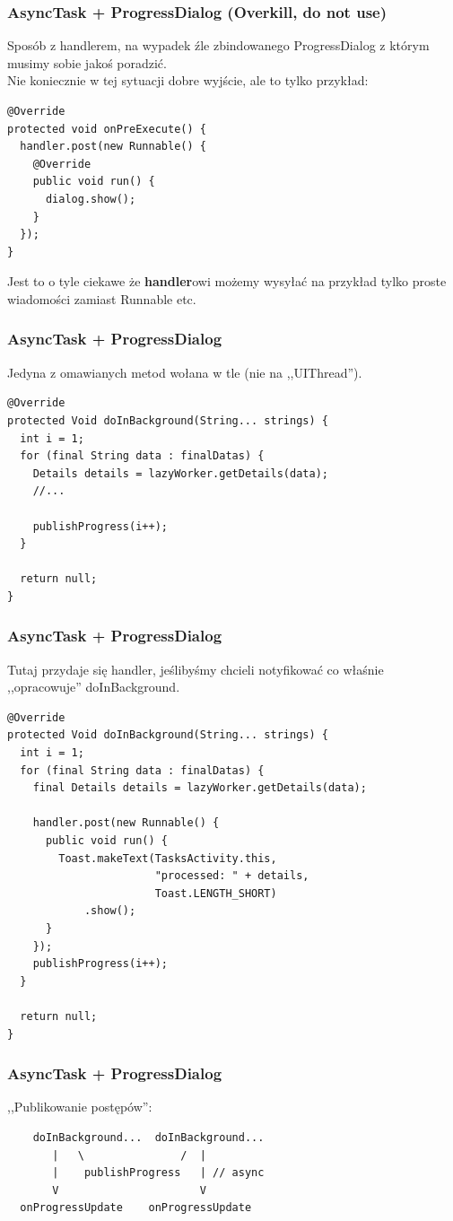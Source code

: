 \documentclass{beamer}
\begin{document}
\begin{frame}[fragile]\frametitle{AsyncTask + ProgressDialog (\textbf{Overkill}, do not use)}
Sposób z handlerem, na wypadek źle zbindowanego ProgressDialog z którym musimy sobie jakoś poradzić. \\
Nie koniecznie w tej sytuacji dobre wyjście, ale to tylko przykład:
\begin{lstlisting}
@Override
protected void onPreExecute() {
  handler.post(new Runnable() {
    @Override
    public void run() {
      dialog.show();
    }
  });
}
\end{lstlisting}
Jest to o tyle ciekawe że \textbf{handler}owi możemy wysyłać na przykład tylko proste wiadomości zamiast Runnable etc.
\end{frame}


\begin{frame}[fragile]\frametitle{AsyncTask + ProgressDialog}
Jedyna z omawianych metod wołana w tle (nie na ,,UIThread'').
\begin{lstlisting}
@Override
protected Void doInBackground(String... strings) {
  int i = 1;
  for (final String data : finalDatas) {
    Details details = lazyWorker.getDetails(data);
    //...

    publishProgress(i++);
  }

  return null;
}
\end{lstlisting}
\end{frame}

\begin{frame}[fragile]\frametitle{AsyncTask + ProgressDialog}
Tutaj przydaje się handler, jeślibyśmy chcieli notyfikować co właśnie ,,opracowuje'' doInBackground.
\begin{lstlisting}
@Override
protected Void doInBackground(String... strings) {
  int i = 1;
  for (final String data : finalDatas) {
    final Details details = lazyWorker.getDetails(data);

    handler.post(new Runnable() {
      public void run() {
        Toast.makeText(TasksActivity.this, 
                       "processed: " + details, 
                       Toast.LENGTH_SHORT)
            .show();
      }
    });
    publishProgress(i++);
  }

  return null;
}
\end{lstlisting}
\end{frame}

\begin{frame}[fragile]\frametitle{AsyncTask + ProgressDialog}
,,Publikowanie postępów'':
\begin{lstlisting}
    doInBackground...  doInBackground...
       |   \               /  |
       |    publishProgress   | // async
       V                      V
  onProgressUpdate    onProgressUpdate
\end{lstlisting}
\end{frame}
\end{document}
